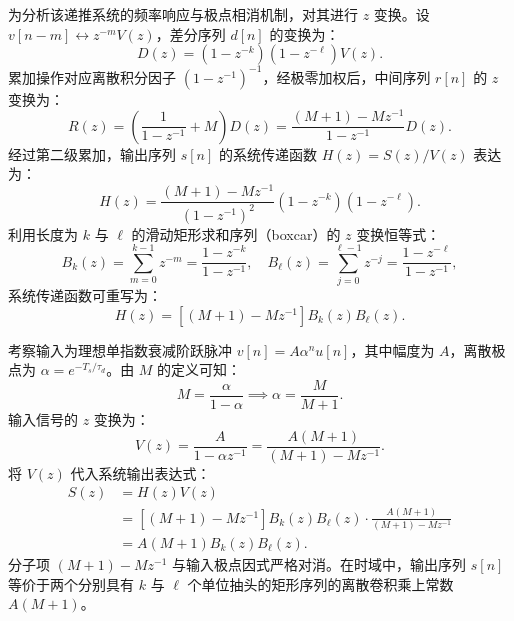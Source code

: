 为分析该递推系统的频率响应与极点相消机制，对其进行 $z$ 变换。设 $v[n-m] \leftrightarrow z^{-m} V(z)$，差分序列 $d[n]$ 的变换为：
\begin{equation}\label{eq:5-3-dz}
D(z) = \left(1 - z^{-k}\right) \left(1 - z^{-\ell}\right) V(z).
\end{equation}
累加操作对应离散积分因子 $(1 - z^{-1})^{-1}$，经极零加权后，中间序列 $r[n]$ 的 $z$ 变换为：
\begin{equation}\label{eq:5-3-rz}
R(z) = \left(\frac{1}{1 - z^{-1}} + M\right) D(z) = \frac{(M+1) - M z^{-1}}{1 - z^{-1}} D(z).
\end{equation}
经过第二级累加，输出序列 $s[n]$ 的系统传递函数 $H(z) = S(z) / V(z)$ 表达为：
\begin{equation}\label{eq:5-3-hz}
H(z) = \frac{(M+1) - M z^{-1}}{(1 - z^{-1})^2} \left(1 - z^{-k}\right) \left(1 - z^{-\ell}\right).
\end{equation}
利用长度为 $k$ 与 $\ell$ 的滑动矩形求和序列（boxcar）的 $z$ 变换恒等式：
\begin{equation}\label{eq:5-3-boxcar}
B_k(z) = \sum_{m=0}^{k-1} z^{-m} = \frac{1 - z^{-k}}{1 - z^{-1}}, \quad B_\ell(z) = \sum_{j=0}^{\ell-1} z^{-j} = \frac{1 - z^{-\ell}}{1 - z^{-1}},
\end{equation}
系统传递函数可重写为：
\begin{equation}\label{eq:5-3-hz-boxcar}
H(z) = \left[(M+1) - M z^{-1}\right] B_k(z) B_\ell(z).
\end{equation}

考察输入为理想单指数衰减阶跃脉冲 $v[n] = A \alpha^n u[n]$，其中幅度为 $A$，离散极点为 $\alpha = e^{-T_s / \tau_d}$。由 $M$ 的定义可知：
\begin{equation}\label{eq:5-3-alpha-m}
M = \frac{\alpha}{1 - \alpha} \implies \alpha = \frac{M}{M + 1}.
\end{equation}
输入信号的 $z$ 变换为：
\begin{equation}\label{eq:5-3-vz}
V(z) = \frac{A}{1 - \alpha z^{-1}} = \frac{A (M+1)}{(M+1) - M z^{-1}}.
\end{equation}
将 $V(z)$ 代入系统输出表达式：
\begin{align}\label{eq:5-3-sz}
S(z) &= H(z) V(z) \nonumber \\
     &= \left[(M+1) - M z^{-1}\right] B_k(z) B_\ell(z) \cdot \frac{A (M+1)}{(M+1) - M z^{-1}} \nonumber \\
     &= A (M+1) B_k(z) B_\ell(z).
\end{align}
分子项 $(M+1) - M z^{-1}$ 与输入极点因式严格对消。在时域中，输出序列 $s[n]$ 等价于两个分别具有 $k$ 与 $\ell$ 个单位抽头的矩形序列的离散卷积乘上常数 $A (M+1)$。

